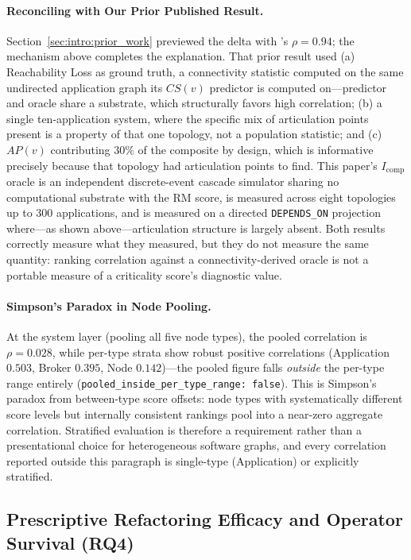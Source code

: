 \paragraph{Reconciling with Our Prior Published Result.} Section~\ref{sec:intro:prior_work} previewed the delta with \citep{yigit2025graph}'s $\rho = 0.94$; the mechanism above completes the explanation. That prior result used (a) Reachability Loss as ground truth, a connectivity statistic computed on the same undirected application graph its $CS(v)$ predictor is computed on---predictor and oracle share a substrate, which structurally favors high correlation; (b) a single ten-application system, where the specific mix of articulation points present is a property of that one topology, not a population statistic; and (c) $AP(v)$ contributing $30\%$ of the composite by design, which is informative precisely because that topology had articulation points to find. This paper's $I_{\text{comp}}$ oracle is an independent discrete-event cascade simulator sharing no computational substrate with the RM score, is measured across eight topologies up to 300 applications, and is measured on a directed \texttt{DEPENDS\_ON} projection where---as shown above---articulation structure is largely absent. Both results correctly measure what they measured, but they do not measure the same quantity: ranking correlation against a connectivity-derived oracle is not a portable measure of a criticality score's diagnostic value.

\paragraph{Simpson's Paradox in Node Pooling.} At the system layer (pooling all five node types), the pooled correlation is $\rho = 0.028$, while per-type strata show robust positive correlations (Application $0.503$, Broker $0.395$, Node $0.142$)---the pooled figure falls \emph{outside} the per-type range entirely (\texttt{pooled\_inside\_per\_type\_range: false}). This is Simpson's paradox from between-type score offsets: node types with systematically different score levels but internally consistent rankings pool into a near-zero aggregate correlation. Stratified evaluation is therefore a requirement rather than a presentational choice for heterogeneous software graphs, and every correlation reported outside this paragraph is single-type (Application) or explicitly stratified.

\subsection{Prescriptive Refactoring Efficacy and Operator Survival (RQ4)}
\label{sec:results:prescriptive}

